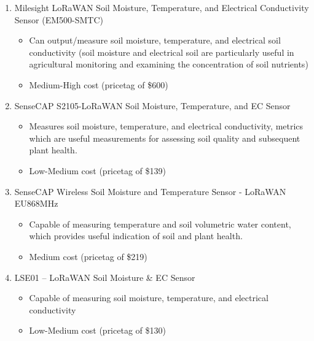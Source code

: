 \documentclass{article}
\begin{document}
\begin{enumerate}
\item Milesight LoRaWAN Soil Moisture, Temperature, and Electrical Conductivity Sensor (EM500-SMTC)
\begin{itemize}
\item Can output/measure soil moisture, temperature, and electrical soil conductivity (soil moisture and electrical soil are particularly useful in agricultural monitoring and examining the concentration of soil nutrients)
\item Medium-High cost (pricetag of \$600)
\end{itemize}
\item SenseCAP S2105-LoRaWAN Soil Moisture, Temperature, and EC Sensor
\begin{itemize}
\item Measures soil moisture, temperature, and electrical conductivity, metrics which are useful measurements for assessing soil quality and subsequent plant health.
\end{itemize}
\begin{itemize}
\item Low-Medium cost (pricetag of \$139)
\end{itemize}

\item SenseCAP Wireless Soil Moisture and Temperature Sensor - LoRaWAN 		EU868MHz 
\begin{itemize}
\item Capable of measuring temperature and soil volumetric water content, which provides useful indication of soil and plant health.
\item Medium cost (pricetag of \$219)																			%
\end{itemize}
\item LSE01 -- LoRaWAN Soil Moisture & EC Sensor
\begin{itemize}
\item Capable of measuring soil moisture, temperature, and electrical conductivity
\item Low-Medium cost (pricetag of \$130)															%
\end{itemize}
\end{enumerate}
\end{document}
